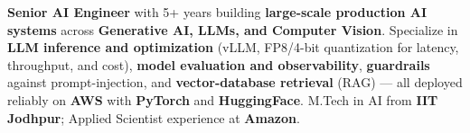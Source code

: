 \documentclass[letter,10pt]{article}
\begin{document}

\textbf{Senior AI Engineer} with 5+ years building \textbf{large-scale production AI systems} across \textbf{Generative AI, LLMs, and Computer Vision}.
Specialize in \textbf{LLM inference and optimization} (vLLM, FP8/4-bit quantization for latency, throughput, and cost), \textbf{model evaluation and observability}, \textbf{guardrails} against prompt-injection, and \textbf{vector-database retrieval} (RAG) --- all deployed reliably on \textbf{AWS} with \textbf{PyTorch} and \textbf{HuggingFace}.
M.Tech in AI from \textbf{IIT Jodhpur}; Applied Scientist experience at \textbf{Amazon}.
\end{document}
